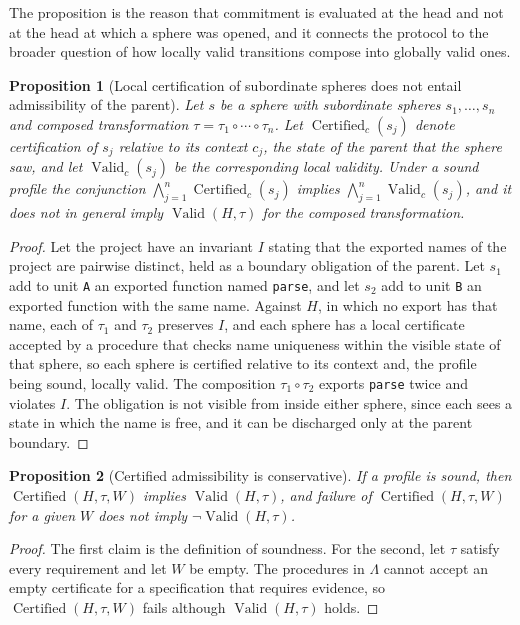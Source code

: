 \documentclass[11pt]{article}
\newtheorem{proposition}{Proposition}
\theoremstyle{remark}
\newcommand{\Adm}{\operatorname{Valid}}
\newcommand{\Admcert}{\operatorname{Certified}}
\begin{document}
The proposition is the reason that commitment is evaluated at the head and not at the head at which a sphere was opened, and it connects the protocol to the broader question of how locally valid transitions compose into globally valid ones.

\begin{proposition}[Local certification of subordinate spheres does not entail admissibility of the parent]\label{prop:nested}
Let $s$ be a sphere with subordinate spheres $s_1,\dots,s_n$ and composed transformation $\tau=\tau_1\circ\cdots\circ\tau_n$. Let $\Admcert_{c}(s_j)$ denote certification of $s_j$ relative to its context $c_j$, the state of the parent that the sphere saw, and let $\Adm_{c}(s_j)$ be the corresponding local validity. Under a sound profile the conjunction $\bigwedge_{j=1}^{n}\Admcert_{c}(s_j)$ implies $\bigwedge_{j=1}^{n}\Adm_{c}(s_j)$, and it does not in general imply $\Adm(H,\tau)$ for the composed transformation.
\end{proposition}
\begin{proof}
Let the project have an invariant $I$ stating that the exported names of the project are pairwise distinct, held as a boundary obligation of the parent. Let $s_1$ add to unit \texttt{A} an exported function named \texttt{parse}, and let $s_2$ add to unit \texttt{B} an exported function with the same name. Against $H$, in which no export has that name, each of $\tau_1$ and $\tau_2$ preserves $I$, and each sphere has a local certificate accepted by a procedure that checks name uniqueness within the visible state of that sphere, so each sphere is certified relative to its context and, the profile being sound, locally valid. The composition $\tau_1\circ\tau_2$ exports \texttt{parse} twice and violates $I$. The obligation is not visible from inside either sphere, since each sees a state in which the name is free, and it can be discharged only at the parent boundary.
\end{proof}

\begin{proposition}[Certified admissibility is conservative]\label{prop:cert}
If a profile is sound, then $\Admcert(H,\tau,W)$ implies $\Adm(H,\tau)$, and failure of $\Admcert(H,\tau,W)$ for a given $W$ does not imply $\neg\Adm(H,\tau)$.
\end{proposition}
\begin{proof}
The first claim is the definition of soundness. For the second, let $\tau$ satisfy every requirement and let $W$ be empty. The procedures in $\Lambda$ cannot accept an empty certificate for a specification that requires evidence, so $\Admcert(H,\tau,W)$ fails although $\Adm(H,\tau)$ holds.
\end{proof}
\end{document}
